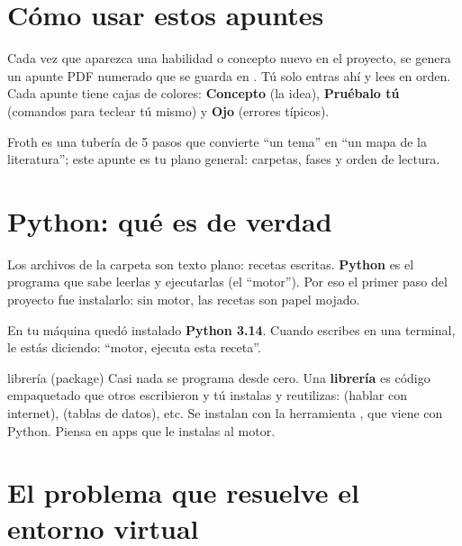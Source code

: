 \documentclass[11pt,a4paper]{article}
\begin{document}
\section{Cómo usar estos apuntes}

Cada vez que aparezca una habilidad o concepto nuevo en el proyecto, se genera un apunte
PDF numerado que se guarda en . Tú solo entras ahí y lees en orden.
Cada apunte tiene cajas de colores: \textcolor{litblue}{\textbf{Concepto}} (la idea),
\textcolor{litgreen}{\textbf{Pruébalo tú}} (comandos para teclear tú mismo) y
\textcolor{litorange}{\textbf{Ojo}} (errores típicos).

\begin{resumen}
Froth es una tubería de 5 pasos que convierte ``un tema'' en ``un mapa de la literatura'';
este apunte es tu plano general: carpetas, fases y orden de lectura.
\end{resumen}
\clearpage
{}
{}

\section{Python: qué es de verdad}

Los archivos  de la carpeta  son texto plano: recetas escritas.
\textbf{Python} es el programa que sabe leerlas y ejecutarlas (el ``motor''). Por eso el
primer paso del proyecto fue instalarlo: sin motor, las recetas son papel mojado.

En tu máquina quedó instalado \textbf{Python 3.14}. Cuando escribes
 en una terminal, le estás diciendo: ``motor, ejecuta esta receta''.

\begin{concepto}{librería (package)}
Casi nada se programa desde cero. Una \textbf{librería} es código empaquetado que otros
escribieron y tú instalas y reutilizas:  (hablar con internet),
 (tablas de datos), etc. Se instalan con la herramienta ,
que viene con Python. Piensa en apps que le instalas al motor.
\end{concepto}

\section{El problema que resuelve el entorno virtual}
\end{document}
